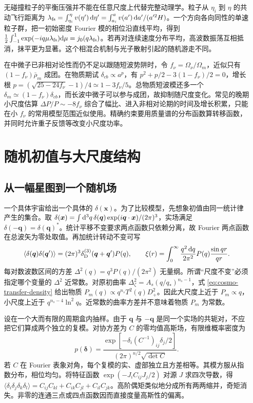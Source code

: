 无碰撞粒子的平衡压强并不能在任意尺度上代替完整动理学。粒子从 $\eta_i$ 到 $\eta$ 的共动飞行距离为 $\lambda_{\rm fs}=\int_{\eta_i}^{\eta}v(\eta')\,\dd\eta'=\int_{a_i}^a v(a')\,\dd a'/(a'^2H)$。一个方向各向同性的单速粒子群，把一初始密度 Fourier 模的相位沿直线平均，得到 $\frac12\int_{-1}^1\exp(-iq\mu\lambda_{\rm fs})\dd\mu=j_0(q\lambda_{\rm fs})$。若再对连续速度分布平均，高波数振荡互相抵消，抹平更为显著。这个相混合机制与光子散射引起的随机游走不同。

在中微子已非相对论性而仍不足以跟随短波势阱时，令 $f_\nu=\Omega_\nu/\Omega_m$，近似只有 $(1-f_\nu)\bar\rho_m$ 成团。在物质期试 $\delta_{cb}\propto a^p$，有 $p^2+p/2-3(1-f_\nu)/2=0$，增长根 $p=(\sqrt{25-24f_\nu}-1)/4\simeq1-3f_\nu/5$。总物质短波模还多一个 $\delta_m\simeq(1-f_\nu)\delta_{cb}$，而长波中微子可以参与成团，故抑制随尺度变化。常见的晚期小尺度估算 $\Delta P/P\sim-8f_\nu$ 综合了幅比、进入非相对论期的时间及增长积累，只能在小 $f_\nu$ 的常用模型范围近似使用。精确约束要用质量谱的分布函数算转移函数，并同时允许重子反馈等改变小尺度功率。

\section{随机初值与大尺度结构}\label{sec:cosmo-statistics}

\subsection{从一幅星图到一个随机场}

一个具体宇宙给出一个具体的 $\delta(\bm x)$。为了比较模型，先想象初值由同一统计律产生的集合。取 $\delta(\bm x)=\int \dd^3q\,\delta(\bm q)\exp(i\bm q\cdot\bm x)/(2\pi)^3$，实场满足 $\delta(-\bm q)=\delta(\bm q)^*$。统计平移不变要求两点函数只依赖分离，故 Fourier 两点函数在总波矢为零处取值。再加统计转动不变可写
\begin{equation}\label{eq:cosmo-stat-power}
 \langle\delta(\bm q)\delta(\bm q')\rangle
  =(2\pi)^3\delta_{\rm D}^{(3)}(\bm q+\bm q')P(q),\qquad
 \xi(r)=\int_0^\infty\frac{q^2\,\dd q}{2\pi^2}P(q)\frac{\sin qr}{qr}.
\end{equation}
每对数波数区间的方差 $\Delta^2(q)=q^3P(q)/(2\pi^2)$ 无量纲。所谓“尺度不变”必须指定哪个变量的 $\Delta^2$ 近常数。对原初曲率 $\Delta_\zeta^2=A_s(q/q_*)^{n_s-1}$，式 \eqref{eq:cosmo-transfer-density} 给出物质 $P_m(q)\propto q^{n_s}T^2(q)D_+^2$。因此大尺度上近于 $P_m\propto q$，小尺度上近于 $q^{n_s-4}\ln^2q$。近常数的曲率方差并不意味着物质 $P_m$ 为常数。

设在一个大而有限的周期盒内抽样。由于 $\bm q$ 与 $-\bm q$ 是同一个实场的共轭对，不应把它们算成两个独立的复模。对协方差为 $C$ 的零均值高斯场，有限维概率密度为
\[
 p(\bm\delta)=\frac{\exp[-\delta_i(C^{-1})_{ij}\delta_j/2]}
                   {(2\pi)^{n/2}\sqrt{\det C}} .
\]
若 $C$ 在 Fourier 表象对角，每个复模的实、虚部独立且方差相等。其模方服从指数分布，相位均匀。将特征函数 $\exp(-J_iC_{ij}J_j/2)$ 对源 $J$ 求四次导数，得 $\langle\delta_i\delta_j\delta_k\delta_l\rangle=C_{ij}C_{kl}+C_{ik}C_{jl}+C_{il}C_{jk}$。高阶偶矩类似地分成所有两两缩并，奇矩消失。非零的连通三点或四点函数因而直接度量高斯性的偏离。

